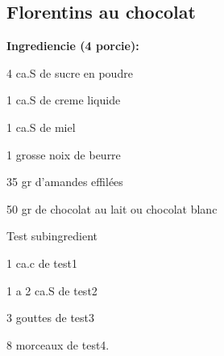 \setcounter{step}{0}

\subsection{ Florentins au chocolat }

\begin{ingredient}
  
  \def\portions{  }
  \textbf{ {\normalsize Ingrediencie (4 porcie):} }

  \begin{main}
      \item 4 ca.S de sucre en poudre
      \item 1 ca.S de creme liquide
      \item 1 ca.S de miel
      \item 1 grosse noix de beurre
      \item 35 gr d’amandes effilées
      \item 50 gr de chocolat au lait ou chocolat blanc
  \end{main}
  
    \begin{subingredient}{Test subingredient}
        \item 1 ca.c de test1
        \item 1 a 2 ca.S de test2
        \item 3 gouttes de test3
        \item 8 morceaux de test4.
    \end{subingredient}
  
\end{ingredient}
